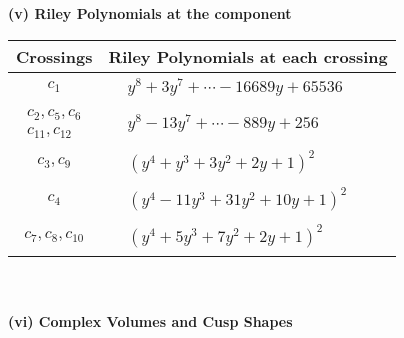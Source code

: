 \documentclass[1p]{elsarticle_modified}
\theoremstyle{definition}
\begin{document}
\newpage\renewcommand{\arraystretch}{1}
\flushleft \textbf{(v) Riley Polynomials at the component}\newline \\
\begin{tabular}{m{50pt}|m{274pt}}
Crossings & \hspace{64pt}Riley Polynomials at each crossing \\
\hline $$\begin{aligned}c_{1}\end{aligned}$$&$\begin{aligned}
&y^8+3 y^7+\cdots-16689 y+65536
\end{aligned}$\\
\hline $$\begin{aligned}c_{2},c_{5},c_{6}\\c_{11},c_{12}\end{aligned}$$&$\begin{aligned}
&y^8-13 y^7+\cdots-889 y+256
\end{aligned}$\\
\hline $$\begin{aligned}c_{3},c_{9}\end{aligned}$$&$\begin{aligned}
&(y^4+y^3+3 y^2+2 y+1)^2
\end{aligned}$\\
\hline $$\begin{aligned}c_{4}\end{aligned}$$&$\begin{aligned}
&(y^4-11 y^3+31 y^2+10 y+1)^2
\end{aligned}$\\
\hline $$\begin{aligned}c_{7},c_{8},c_{10}\end{aligned}$$&$\begin{aligned}
&(y^4+5 y^3+7 y^2+2 y+1)^2
\end{aligned}$\\
\hline
\end{tabular}\\~\\
\newpage\flushleft \textbf{(vi) Complex Volumes and Cusp Shapes}
\end{document}

